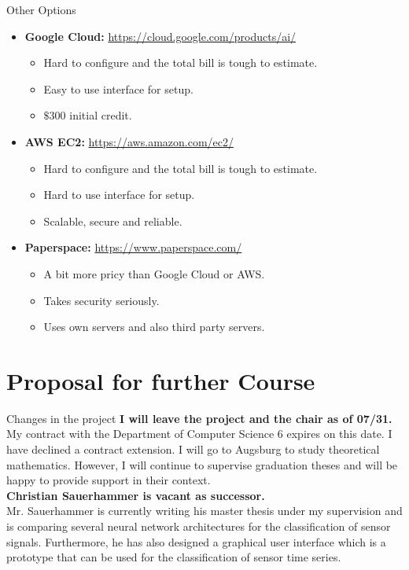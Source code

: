\documentclass[aspectratio=169,t]{beamer}
\begin{document}
  { 
    \begin{frame}{Other Options}
    \begin{itemize}
      \item \textbf{Google Cloud:} \href{https://cloud.google.com/products/ai/}{https://cloud.google.com/products/ai/}
      \begin{itemize}
        \item Hard to configure and the total bill is tough to estimate.
        \item Easy to use interface for setup.
        \item $\$300$ initial credit.
      \end{itemize}
      \item \textbf{AWS EC2:} \href{https://aws.amazon.com/ec2/?ec2-whats-new.sort-by=item.additionalFields.postDateTime&ec2-whats-new.sort-order=desc}{https://aws.amazon.com/ec2/}
      \begin{itemize}
        \item Hard to configure and the total bill is tough to estimate.
        \item Hard to use interface for setup.
        \item Scalable, secure and reliable.
      \end{itemize}
      \item \textbf{Paperspace:} \href{https://www.paperspace.com/}{https://www.paperspace.com/}
      \begin{itemize}
        \item A bit more pricy than Google Cloud or AWS.
        \item Takes security seriously.
        \item Uses own servers and also third party servers.
      \end{itemize}
    \end{itemize}
    \end{frame}
  }

\section{Proposal for further Course}
  { 
    \begin{frame}{Changes in the project}
    \textbf{I will leave the project and the chair as of 07/31.}\\
    My contract with the Department of Computer Science 6 expires on this date. I have declined a contract extension. I will go to Augsburg to study theoretical mathematics. However, I will continue to supervise graduation theses and will be happy to provide support in their context.\\[0.2cm]

    \textbf{Christian Sauerhammer is vacant as successor.}\\
    Mr. Sauerhammer is currently writing his master thesis under my supervision and is comparing several neural network architectures for the classification of sensor signals. Furthermore, he has also designed a graphical user interface which is a prototype that can be used for the classification of sensor time series.
    \end{frame}
  }
\end{document}
